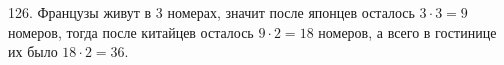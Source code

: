 126. Французы живут в 3 номерах, значит после японцев осталось $3\cdot3=9$ номеров, тогда после китайцев осталось $9\cdot2=18$ номеров, а всего в гостинице их было $18\cdot2=36.$\\
